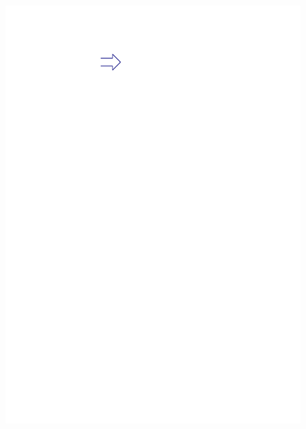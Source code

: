 \documentclass[navbaroff,en]{sdqbeamer}
\begin{document}
\begin{frame}
\begin{columns}
\begin{column}{0.48\textwidth}
			\begin{figure}
				\begin{minipage}{.3\textwidth}
					\centering
					\includegraphics[scale=0.7]{images/arrow.ipe.pdf}
				\end{minipage}%
				\begin{minipage}{.6\textwidth}
					\centering
					\scalebox{0.115}{}
				\end{minipage}
			\end{figure}
		\end{column}
	\end{columns}

\end{frame}
\end{document}
